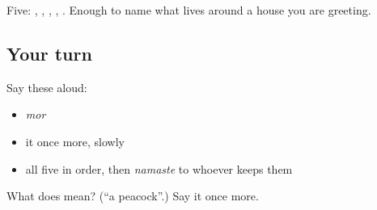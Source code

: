 \begin{grammarlens}[title={What you've built}]
Five: , , , , . Enough to name what lives around a house you are greeting.
\end{grammarlens}

\subsection*{Your turn}
Say these aloud:

\begin{itemize}
\raggedright
  \item \emph{mor}
  \item it once more, slowly
  \item all five in order, then \emph{namaste} to whoever keeps them
\end{itemize}

\begin{tcolorbox}[breakable,colback=teal!4,colframe=teal!35!black,title={Before you move on}]
What does  mean? (\textquotedblleft{}a peacock\textquotedblright{}.) Say it once more.
\end{tcolorbox}
